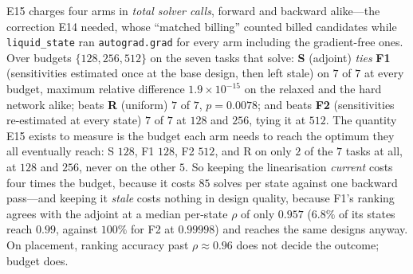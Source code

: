 \documentclass{article}
\begin{document}
E15 charges four arms in \emph{total solver calls}, forward and backward alike---the
correction E14 needed, whose ``matched billing'' counted billed candidates while
\texttt{liquid\_state} ran \texttt{autograd.grad} for every arm including the gradient-free
ones.  Over budgets $\{128, 256, 512\}$ on the seven tasks that solve: \textbf{S} (adjoint)
\emph{ties} \textbf{F1} (sensitivities estimated once at the base design, then left stale) on
$7$ of $7$ at every budget, maximum relative difference $1.9\times10^{-15}$ on the relaxed
and the hard network alike; beats \textbf{R} (uniform) $7$ of $7$, $p = 0.0078$; and beats
\textbf{F2} (sensitivities re-estimated at every state) $7$ of $7$ at $128$ and $256$, tying
it at $512$.  The quantity E15 exists to measure is the budget each arm needs to reach the
optimum they all eventually reach: S $128$, F1 $128$, F2 $512$, and R on only $2$ of the $7$
tasks at all, at $128$ and $256$, never on the other $5$.  So keeping the linearisation \emph{current} costs four times the budget,
because it costs $85$ solves per state against one backward pass---and keeping it \emph{stale}
costs nothing in design quality, because F1's ranking agrees with the adjoint at a median
per-state $\rho$ of only $0.957$ ($6.8\%$ of its states reach $0.99$, against $100\%$ for F2
at $0.99998$) and reaches the same designs anyway.  On placement, ranking accuracy past
$\rho \approx 0.96$ does not decide the outcome; budget does.
\end{document}
